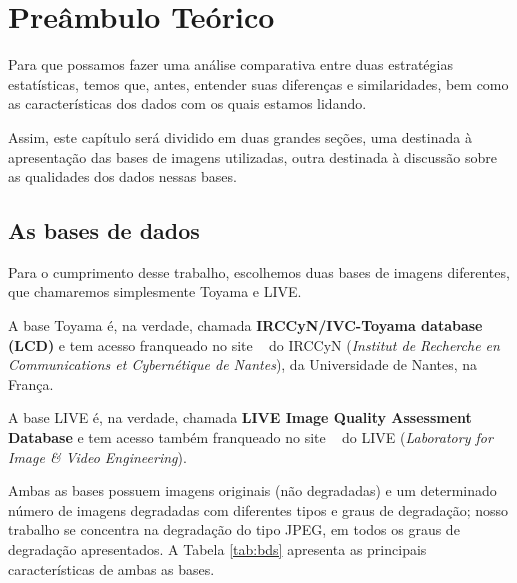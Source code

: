 \chapter{Preâmbulo Teórico}

Para que possamos fazer uma análise comparativa entre duas estratégias estatísticas, temos que, antes, entender suas diferenças e similaridades, bem como as características dos dados com os quais estamos lidando.

Assim, este capítulo será dividido em duas grandes seções, uma destinada à apresentação das bases de imagens utilizadas, outra destinada à discussão sobre as qualidades dos dados nessas bases.

\section{As bases de dados}

Para o cumprimento desse trabalho, escolhemos duas bases de imagens diferentes, que chamaremos simplesmente Toyama e LIVE.

A base Toyama é, na verdade, chamada \textbf{IRCCyN/IVC-Toyama database (LCD)} e tem acesso franqueado no site ~\cite{Tourancheau2008} do IRCCyN (\emph{Institut de Recherche en Communications et Cybernétique de Nantes}), da Universidade de Nantes, na França.

A base LIVE é, na verdade, chamada \textbf{LIVE Image Quality Assessment Database} e tem acesso também franqueado no site ~\cite{livedb} do LIVE (\emph{Laboratory for Image \& Video Engineering}).

Ambas as bases possuem imagens originais (não degradadas) e um determinado número de imagens degradadas com diferentes tipos e graus de degradação; nosso trabalho se concentra na degradação do tipo JPEG, em todos os graus de degradação apresentados. A Tabela \ref{tab:bds} apresenta as principais características de ambas as bases.

